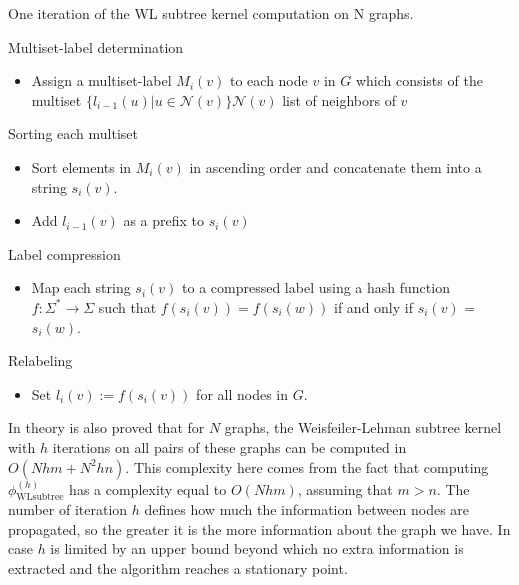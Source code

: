 \documentclass[11pt,a4paper]{article}
\begin{document}
\begin{algorithm}
	\caption{One iteration of the WL subtree kernel computation on N graphs.}
	\begin{algorithmic}[1]

		\State Multiset-label determination
		\begin{itemize}
			\item Assign a multiset-label $M_i(v)$ to each node $v$ in $G$ which consists of the multiset $\big\{l_{i-1}(u)|u\in \mathcal{N}(v)\big\}$\Comment$\mathcal{N}(v)$ list of neighbors of $v$	
		\end{itemize}
	
		\State Sorting each multiset
		\begin{itemize}
			\item Sort elements in $M_i(v)$ in ascending order and concatenate them into a string $s_i(v)$.
			\item Add $l_{i-1}(v)$ as a prefix to $s_i(v)$
		\end{itemize} 
		
		\State Label compression
		\begin{itemize}
			
			\item Map each string $s_i(v)$ to a compressed label using a hash function $f:\Sigma^* \rightarrow \Sigma$ such that $f(s_i(v)) = f(s_i(w))$ if and only if $s_i(v)$ = $s_i(w)$. 
		\end{itemize}
		\State Relabeling
		\begin{itemize}
			\item Set $l_i(v):= f(s_i(v))$ for all nodes in $G$.
		\end{itemize}		

	\end{algorithmic}
\end{algorithm}

In theory is also proved that for $N$ graphs, the Weisfeiler-Lehman subtree kernel with $h$ iterations on all pairs of these graphs can be computed in $O(Nhm + N^2hn)$. This complexity here comes from the fact that computing $\phi^{(h)}_{\text{WLsubtree}}$ has a complexity equal to $O(Nhm)$, assuming that $m > n$. The number of iteration $h$ defines how much the information between nodes are propagated, so the greater it is the more information about the graph we have. In case $h$ is limited by an upper bound beyond which no extra information is extracted and the algorithm reaches a stationary point.
\end{document}

